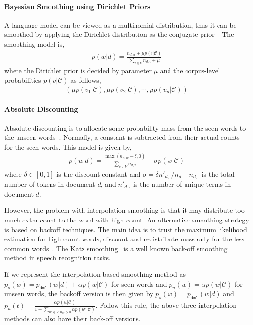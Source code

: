 \paragraph{Bayesian Smoothing using Dirichlet Priors}

A language model can be viewed as a multinomial distribution, thus it can be smoothed by applying the Dirichlet distribution as the conjugate prior~\citep{mackay95dirichlet}. The smoothing model is,
\begin{align}
p(w|d) = \frac{n_{d,w} + \mu p(t|\mathcal{C})}{\sum_{v \in V} n_{d,v} + \mu}
\end{align}
where the Dirichlet prior is decided by parameter $\mu$ and the corpus-level probabilities $p(v|\mathcal{C})$ as follows,
\begin{align}
(\mu p(v_1 | \mathcal{C}), \mu p(v_2 | \mathcal{C}), \cdots, \mu p(v_n | \mathcal{C}))
\label{eq:lm-bs}
\end{align}

\paragraph{Absolute Discounting}

Absolute discounting is to allocate some probability mass from the seen words to the unseen words~\cite{Ney-1994}. Normally, a constant is subtracted from their actual counts for the seen words. This model is given by,
\begin{align}
p(w|d) = \frac{\max(n_{d,w} - \delta, 0)}{\sum_{v \in V} n_{d,v}} + \sigma p(w|\mathcal{C})
\end{align}
where $\delta \in [0,1]$ is the discount constant and $\sigma = \delta n'_{d,\cdot} / n_{d, \cdot}$, $n_{d, \cdot}$ is the total number of tokens in document $d$, and $n'_{d,\cdot}$ is the number of unique terms in document $d$.

However, the problem with interpolation smoothing is that it may distribute too much extra count to the word with high count. An alternative smoothing strategy is based on backoff techniques. The main idea is to trust the maximum likelihood estimation for high count words, discount and  redistribute mass only for the less common words~\cite{zhai-01}. The Katz smoothing~\citep{katz-87} is a well known back-off smoothing method in speech recognition tasks.

If we represent the interpolation-based smoothing method as $p_s(w) = p_{\texttt{dml}}(w|d) + \alpha p(w|\mathcal{C})$ for seen words and $p_u(w) = \alpha p(w|\mathcal{C})$ for unseen words, the backoff version is then given by $p_s(w) = p_{\texttt{dml}}(w|d)$ and $p_u(t) = \frac{\alpha p(w|\mathcal{C})}{1-\sum_{w' \in V: n_{w'}>0} \alpha p(w'|\mathcal{C})}$. Follow this rule, the above three interpolation methods can also have their back-off versions.

